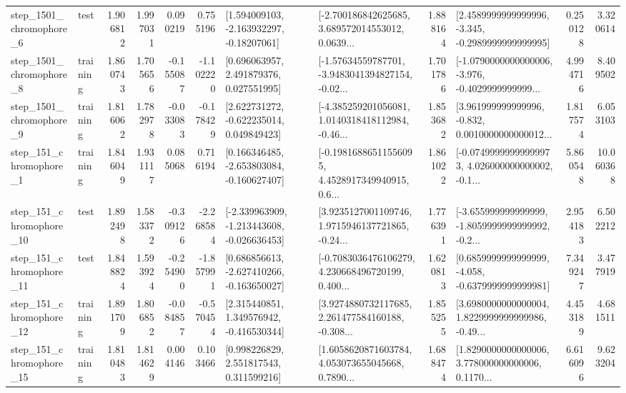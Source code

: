 \begin{tabular}{llrrrrllrlrr}
  step\_1501\_chromophore\_6 &      test &      1.906812 &    1.997031 &      0.090219 &  0.755196 &    [1.594009103, -2.163932297, -0.18207061] &  [-2.700186842625685, 3.689572014553012, 0.0639... &       1.888164 &  [2.4589999999999996, -3.345, -0.2989999999999995] &            0.250128 &          3.320614 \\
  step\_1501\_chromophore\_8 &  training &      1.860743 &    1.705656 &     -0.155087 & -1.102220 &     [0.696063957, 2.491879376, 0.027551995] &  [-1.57634559787701, -3.9483041394827154, -0.02... &       1.701786 &  [-1.0790000000000006, -3.976, -0.4029999999999... &            4.994716 &          8.409502 \\
  step\_1501\_chromophore\_9 &  training &      1.816062 &    1.782978 &     -0.033083 & -0.178429 &    [2.622731272, -0.622235014, 0.049849423] &  [-4.385259201056081, 1.0140318418112984, -0.46... &       1.853682 &  [3.961999999999996, -0.832, 0.0010000000000012... &            1.817574 &          6.053103 \\
   step\_151\_chromophore\_1 &  training &      1.846049 &    1.931117 &      0.085068 &  0.716194 &   [0.166346485, -2.653803084, -0.160627407] &  [-0.19816886511556095, 4.4528917349940915, 0.6... &       1.861022 &  [-0.07499999999999973, 4.026000000000002, -0.1... &            5.860548 &         10.060368 \\
  step\_151\_chromophore\_10 &      test &      1.892498 &    1.583372 &     -0.309126 & -2.268584 &  [-2.339963909, -1.213443608, -0.026636453] &  [3.9235127001109746, 1.9715946137721865, -0.24... &       1.776391 &  [-3.655999999999999, -1.8059999999999992, -0.2... &            2.954183 &          6.502212 \\
  step\_151\_chromophore\_11 &      test &      1.848824 &    1.593924 &     -0.254900 & -1.857991 &   [0.686856613, -2.627410266, -0.163650027] &  [-0.7083036476106279, 4.230668496720199, 0.400... &       1.620813 &  [0.6859999999999999, -4.058, -0.6379999999999981] &            7.349247 &          3.477919 \\
  step\_151\_chromophore\_12 &  training &      1.891709 &    1.806852 &     -0.084857 & -0.570454 &    [2.315440851, 1.349576942, -0.416530344] &  [3.9274880732117685, 2.261477584160188, -0.308... &       1.855255 &  [3.6980000000000004, 1.8229999999999986, -0.49... &            4.453189 &          4.681511 \\
  step\_151\_chromophore\_15 &  training &      1.810483 &    1.814629 &      0.004146 &  0.103466 &     [0.998226829, 2.551817543, 0.311599216] &  [1.6058620871603784, 4.053073655045668, 0.7890... &       1.688474 &  [1.8290000000000006, 3.778000000000006, 0.1170... &            6.616096 &          9.623204 \\

\end{tabular}
